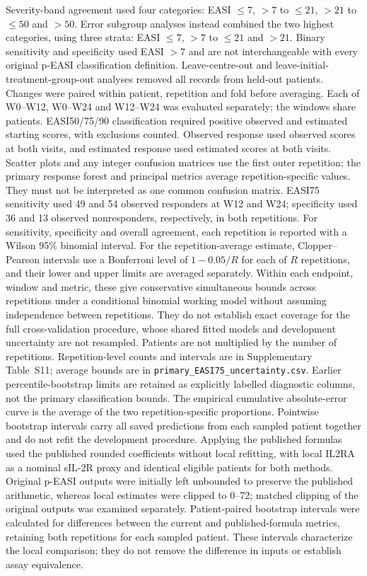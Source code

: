 \documentclass[10pt,a4paper]{article}
\begin{document}
Severity-band agreement used four categories: EASI $\leq7$, $>7$ to $\leq21$, $>21$ to $\leq50$ and $>50$. Error subgroup analyses instead combined the two highest categories, using three strata: EASI $\leq7$, $>7$ to $\leq21$ and $>21$. Binary sensitivity and specificity used EASI $>7$ and are not interchangeable with every original p-EASI classification definition. Leave-centre-out and leave-initial-treatment-group-out analyses removed all records from held-out patients. Changes were paired within patient, repetition and fold before averaging. Each of W0--W12, W0--W24 and W12--W24 was evaluated separately; the windows share patients. EASI50/75/90 classification required positive observed and estimated starting scores, with exclusions counted. Observed response used observed scores at both visits, and estimated response used estimated scores at both visits. Scatter plots and any integer confusion matrices use the first outer repetition; the primary response forest and principal metrics average repetition-specific values. They must not be interpreted as one common confusion matrix. EASI75 sensitivity used 49 and 54 observed responders at W12 and W24; specificity used 36 and 13 observed nonresponders, respectively, in both repetitions. For sensitivity, specificity and overall agreement, each repetition is reported with a Wilson 95\% binomial interval. For the repetition-average estimate, Clopper--Pearson intervals use a Bonferroni level of $1-0.05/R$ for each of $R$ repetitions, and their lower and upper limits are averaged separately. Within each endpoint, window and metric, these give conservative simultaneous bounds across repetitions under a conditional binomial working model without assuming independence between repetitions. They do not establish exact coverage for the full cross-validation procedure, whose shared fitted models and development uncertainty are not resampled. Patients are not multiplied by the number of repetitions. Repetition-level counts and intervals are in Supplementary Table~S11; average bounds are in \texttt{primary\_EASI75\_uncertainty.csv}. Earlier percentile-bootstrap limits are retained as explicitly labelled diagnostic columns, not the primary classification bounds. The empirical cumulative absolute-error curve is the average of the two repetition-specific proportions. Pointwise bootstrap intervals carry all saved predictions from each sampled patient together and do not refit the development procedure. Applying the published formulas used the published rounded coefficients without local refitting, with local IL2RA as a nominal sIL-2R proxy and identical eligible patients for both methods. Original p-EASI outputs were initially left unbounded to preserve the published arithmetic, whereas local estimates were clipped to 0--72; matched clipping of the original outputs was examined separately. Patient-paired bootstrap intervals were calculated for differences between the current and published-formula metrics, retaining both repetitions for each sampled patient. These intervals characterize the local comparison; they do not remove the difference in inputs or establish assay equivalence.\citep{thijs2017,thijs2019,bakker2020}
\end{document}
